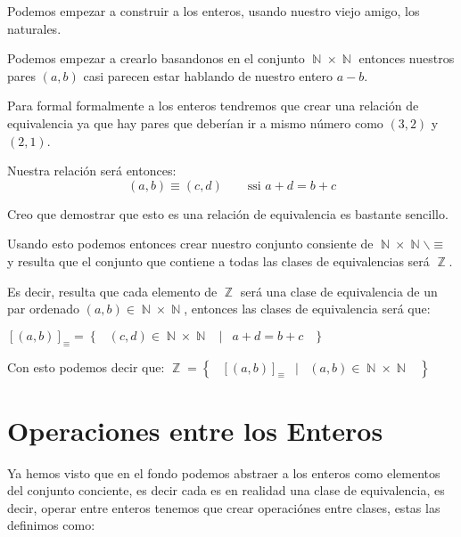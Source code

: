 \documentclass[12pt, fleqn]{report}                             %
\newcommand \Quote {\qq}                                        %
\DeclareMathOperator \Space {\quad}                             %
\DeclareMathOperator \MiniSpace {\;}                            %
\newcommand \Such {\MiniSpace|\MiniSpace}                       %
\newcommand{\Set}[1]{\left\{ \MiniSpace #1 \MiniSpace \right\}} %
\DeclareMathOperator \Naturals  {\mathbb{N}}                     %
\DeclareMathOperator \Integers  {\mathbb{Z}}                     %
\begin{document}
        Podemos empezar a construir a los enteros, usando nuestro viejo amigo, los 
        naturales.

        Podemos empezar a crearlo basandonos en el conjunto $\Naturals \times \Naturals$
        entonces nuestros pares $(a, b)$ casi parecen estar hablando de nuestro entero 
        $a-b$.

        Para formal formalmente a los enteros tendremos que crear una relación de equivalencia
        ya que hay pares que deberían ir a mismo número como $(3,2)$ y $(2,1)$.

        Nuestra relación será entonces:
        \begin{equation}
            (a,b) \equiv (c,d) \Space \text{ ssi } a + d = b + c
        \end{equation}

        Creo que demostrar que esto es una relación de equivalencia es bastante sencillo.

        Usando esto podemos entonces crear nuestro conjunto consiente de
        $\Naturals \times \Naturals \backslash \equiv$ y resulta que el conjunto que contiene
        a todas las clases de equivalencias será $\Integers$.

        Es decir, resulta que cada elemento de $\Integers$ será una clase de equivalencia
        de un par ordenado $(a,b) \in \Naturals \times \Naturals$, entonces
        las clases de equivalencia será que:

        $[(a,b)]_{\equiv} = \Set{(c,d) \in \Naturals \times \Naturals \Such a+d=b+c}$

        Con esto podemos decir que:
        $\Integers = \Set{ [(a,b)]_{\equiv} \Such (a,b) \in \Naturals \times \Naturals}$


        \clearpage
        \section{Operaciones entre los Enteros}

            Ya hemos visto que en el fondo podemos abstraer a los enteros como elementos del
            conjunto conciente, es decir cada \Quote{número entero} es en realidad una clase
            de equivalencia, es decir, operar entre enteros tenemos que crear operaciónes entre
            clases, estas las definimos como:
\end{document}
